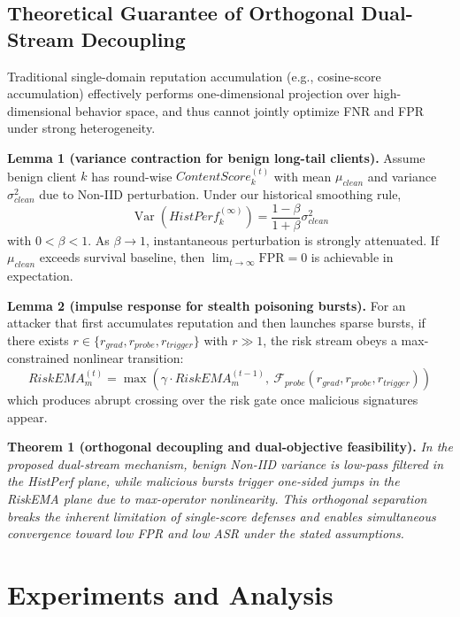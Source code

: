 \documentclass[runningheads]{llncs}
\begin{document}
\subsection{Theoretical Guarantee of Orthogonal Dual-Stream Decoupling}
Traditional single-domain reputation accumulation (e.g., cosine-score accumulation) effectively performs one-dimensional projection over high-dimensional behavior space, and thus cannot jointly optimize FNR and FPR under strong heterogeneity.

\textbf{Lemma 1 (variance contraction for benign long-tail clients).}
Assume benign client $k$ has round-wise $ContentScore_k^{(t)}$ with mean $\mu_{clean}$ and variance $\sigma_{clean}^2$ due to Non-IID perturbation. Under our historical smoothing rule,
\begin{equation}
    \operatorname{Var}(HistPerf_{k}^{(\infty)}) = \frac{1-\beta}{1+\beta} \sigma_{clean}^{2}
\end{equation}
with $0<\beta<1$. As $\beta\to1$, instantaneous perturbation is strongly attenuated. If $\mu_{clean}$ exceeds survival baseline, then $\lim_{t \to \infty} \text{FPR}=0$ is achievable in expectation.

\textbf{Lemma 2 (impulse response for stealth poisoning bursts).}
For an attacker that first accumulates reputation and then launches sparse bursts, if there exists $r \in \{r_{grad}, r_{probe}, r_{trigger}\}$ with $r \gg 1$, the risk stream obeys a max-constrained nonlinear transition:
\begin{equation}
    RiskEMA_m^{(t)} = \max \left( \gamma \cdot RiskEMA_m^{(t-1)},\ \mathcal{F}_{probe}(r_{grad}, r_{probe}, r_{trigger}) \right)
\end{equation}
which produces abrupt crossing over the risk gate once malicious signatures appear.

\textbf{Theorem 1 (orthogonal decoupling and dual-objective feasibility).}
\textit{In the proposed dual-stream mechanism, benign Non-IID variance is low-pass filtered in the HistPerf plane, while malicious bursts trigger one-sided jumps in the RiskEMA plane due to max-operator nonlinearity. This orthogonal separation breaks the inherent limitation of single-score defenses and enables simultaneous convergence toward low FPR and low ASR under the stated assumptions.}

\section{Experiments and Analysis}
\label{sec:experiments}
\end{document}
